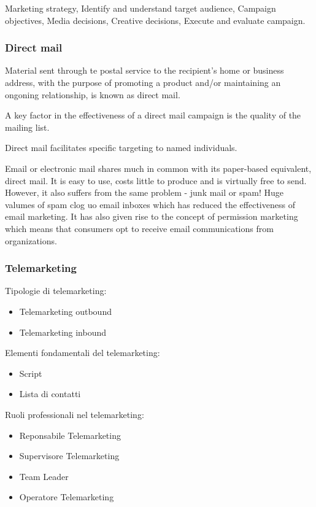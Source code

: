 \documentclass{article}
\begin{document}
Marketing strategy, Identify and understand target audience, Campaign objectives, Media decisions, Creative decisions, Execute and evaluate campaign.

\subsubsection{Direct mail}
Material sent through te postal service to the recipient's home or business address, with the purpose of promoting a product and/or maintaining an ongoning relationship, is known as direct mail.

A key factor in the effectiveness of a direct mail campaign is the quality of the mailing list.

Direct mail facilitates specific targeting to named individuals. 

Email or electronic mail shares much in common with its paper-based equivalent, direct mail. It is easy to use, costs little to produce and is virtually free to send. However, it also suffers from the same problem - junk mail or spam! Huge valumes of spam clog uo email inboxes which has reduced the effectiveness of email marketing. It has also given rise to the concept of permission marketing which means that consumers opt to receive email communications from organizations.

\subsubsection{Telemarketing}

Tipologie di telemarketing:
\begin{itemize}
    \item Telemarketing outbound
    \item Telemarketing inbound
\end{itemize}

Elementi fondamentali del telemarketing:
\begin{itemize}
    \item Script
    \item Lista di contatti
\end{itemize}

Ruoli professionali nel telemarketing:
\begin{itemize}
    \item Reponsabile Telemarketing
    \item Supervisore Telemarketing
    \item Team Leader
    \item Operatore Telemarketing
\end{itemize}
\end{document}
